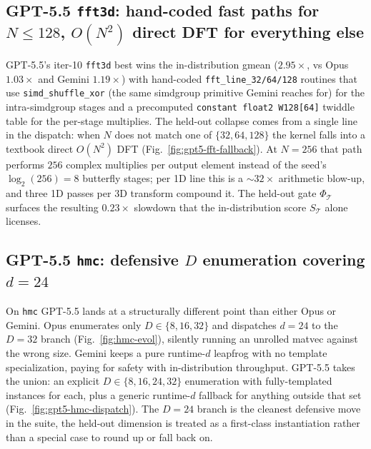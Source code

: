 \documentclass{article}
\theoremstyle{plain}
\theoremstyle{definition}
\theoremstyle{remark}
\begin{document}
\subsection{GPT-5.5 \texttt{fft3d}: hand-coded fast paths for $N{\leq}128$, $O(N^2)$ direct DFT for everything else}

GPT-5.5's iter-10 \texttt{fft3d} best wins the in-distribution gmean
($2.95\times$, vs Opus $1.03\times$ and Gemini $1.19\times$) with
hand-coded \texttt{fft\_line\_32/64/128} routines that use
\texttt{simd\_shuffle\_xor} (the same simdgroup primitive Gemini
reaches for) for the intra-simdgroup stages and a precomputed
\texttt{constant float2 W128[64]} twiddle table for the per-stage
multiplies. The held-out collapse comes from a single line in the
dispatch: when $N$ does not match one of $\{32, 64, 128\}$ the
kernel falls into a textbook direct $O(N^{2})$ DFT
(Fig.~\ref{fig:gpt5-fft-fallback}). At $N{=}256$ that path performs
$256$ complex multiplies per output element instead of the seed's
$\log_{2}(256){=}8$ butterfly stages; per 1D line this is a
${\sim}32{\times}$ arithmetic blow-up, and three 1D passes per 3D
transform compound it. The held-out gate $\Phi_{\mathcal{T}}$ surfaces
the resulting $0.23\times$ slowdown that the in-distribution score
$S_{\mathcal{T}}$ alone licenses.

\subsection{GPT-5.5 \texttt{hmc}: defensive $D$ enumeration covering $d{=}24$}

On \texttt{hmc} GPT-5.5 lands at a structurally different point than either
Opus or Gemini. Opus enumerates only $D{\in}\{8,16,32\}$ and dispatches
$d{=}24$ to the $D{=}32$ branch (Fig.~\ref{fig:hmc-evol}), silently
running an unrolled matvec against the wrong size. Gemini keeps a pure
runtime-$d$ leapfrog with no template specialization, paying for safety
with in-distribution throughput. GPT-5.5 takes the union: an explicit
$D{\in}\{8,16,24,32\}$ enumeration with fully-templated instances for
each, plus a generic runtime-$d$ fallback for anything outside that set
(Fig.~\ref{fig:gpt5-hmc-dispatch}). The $D{=}24$ branch is the
cleanest defensive move in the suite, the held-out dimension is
treated as a first-class instantiation rather than a special case to
round up or fall back on.
\end{document}
